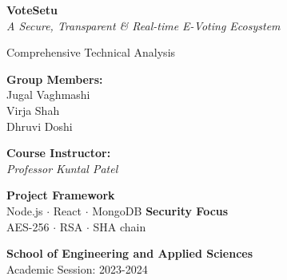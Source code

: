 \documentclass[11pt,a4paper]{article}
\begin{document}
\begin{titlepage}
    \centering
    \vspace*{1.5cm}
    {\Huge \bfseries \color{primary} VoteSetu}\\[0.5cm]
    {\Large \textit{A Secure, Transparent \& Real-time E-Voting Ecosystem}}\\[1.5cm]
    
    \begin{tcolorbox}[colback=primary, colframe=primary, arc=10pt, boxrule=2pt, center title, title=\color{white}\textbf{PROJECT PROGRESS REPORT}]
        \centering \color{white} \Large Comprehensive Technical Analysis
    \end{tcolorbox}
    
    \vspace{2cm}
    
    \begin{minipage}{0.4\textwidth}
        \begin{flushleft} \large
            \textbf{Group Members:}\\
            \textcolor{primary}{Jugal Vaghmashi}\\
            \textcolor{primary}{Virja Shah}\\
            \textcolor{primary}{Dhruvi Doshi}
        \end{flushleft}
    \end{minipage}
    \begin{minipage}{0.5\textwidth}
        \begin{flushright} \large
            \textbf{Course Instructor:}\\
            \textit{Professor Kuntal Patel}
        \end{flushright}
    \end{minipage}
    
    \vfill
    \begin{tcolorbox}[colframe=lightgray, colback=white, sidebyside, sidebyside align=top, boxrule=0.5pt]
        \centering \small \textbf{Project Framework}\\ Node.js $\cdot$ React $\cdot$ MongoDB
        \tcblower
        \centering \small \textbf{Security Focus}\\ AES-256 $\cdot$ RSA $\cdot$ SHA chain
    \end{tcolorbox}
    \vspace{1cm}
    \textbf{School of Engineering and Applied Sciences} \\
    Academic Session: 2023-2024
\end{titlepage}
\end{document}
